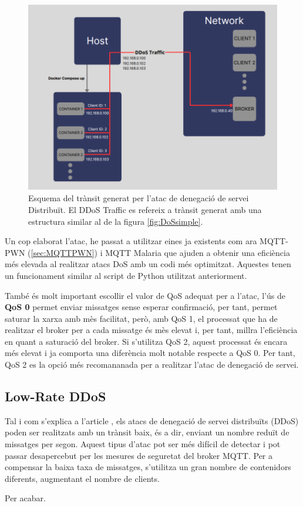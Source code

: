   \begin{figure}[H]
    \centering
    \includegraphics[width=1\textwidth]{img/DDoS.png}
    \caption{Esquema del trànsit generat per l'atac de denegació de servei Distribuït. El DDoS Traffic es refereix a trànsit generat amb una estructura similar al de la figura \ref{fig:DoSsimple}.}
    \label{fig:DDoS}
  \end{figure}

Un cop elaborat l'atac, he passat a utilitzar eines ja existents com ara MQTT-PWN (\ref{sec:MQTTPWN}) i MQTT Malaria que ajuden a obtenir una eficiència més elevada al realitzar atacs DoS amb un codi més optimitzat. Aquestes tenen un funcionament similar al script de Python utilitzat anteriorment.

També és molt important escollir el valor de QoS adequat per a l'atac, l'ús de \textbf{QoS 0} permet enviar missatges sense esperar confirmació, per tant, permet saturar la xarxa amb mès facilitat, però, amb QoS 1, el processat que ha de realitzar el broker per a cada missatge és mès elevat i, per tant, millra l'eficiència en quant a saturació del broker. Si s'utilitza QoS 2, aquest processat és encara més elevat i ja comporta una diferència molt notable respecte a QoS 0. Per tant, QoS 2 es la opció més recomananada per a realitzar l'atac de denegació de servei. 

\subsection{Low-Rate DDoS}

Tal i com s'explica a l'article \cite{lowrateDDoSexp}, els atacs de denegació de servei distribuïts (DDoS) poden ser realitzats amb un trànsit baix, és a dir, enviant un nombre reduït de missatges per segon. Aquest tipus d'atac pot ser més difícil de detectar i pot passar desapercebut per les mesures de seguretat del broker MQTT. Per a compensar la baixa taxa de missatges, s'utilitza un gran nombre de contenidors diferents, augmentant el nombre de clients.

Per acabar.